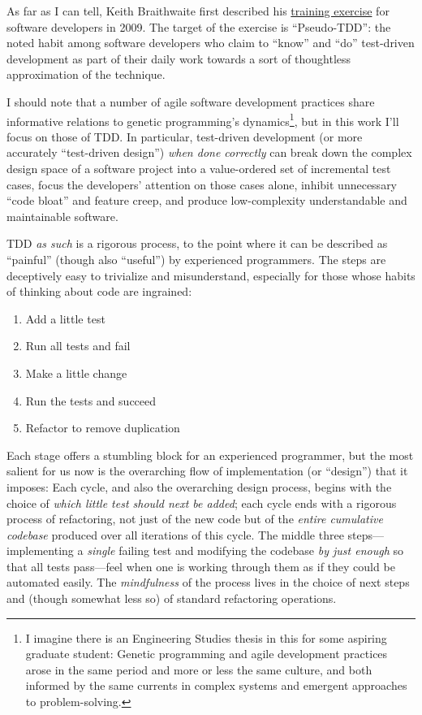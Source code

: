 As far as I can tell, Keith Braithwaite first described his \href{http://cumulative-hypotheses.org/2011/08/30/tdd-as-if-you-meant-it/}{training exercise} for software developers in 2009. The target of the exercise is ``Pseudo-TDD'': the noted habit among software developers who claim to ``know'' and ``do'' test-driven development as part of their daily work towards a sort of thoughtless approximation of the technique.

I should note that a number of agile software development practices share informative relations to genetic programming's dynamics\footnote{I imagine there is an Engineering Studies thesis in this for some aspiring graduate student: Genetic programming and agile development practices arose in the same period and more or less the same culture, and both informed by the same currents in complex systems and emergent approaches to problem-solving.}, but in this work I'll focus on those of TDD. In particular, test-driven development (or more accurately ``test-driven design'') \emph{when done correctly} can break down the complex design space of a software project into a value-ordered set of incremental test cases, focus the developers' attention on those cases alone, inhibit unnecessary ``code bloat'' and feature creep, and produce low-complexity understandable and maintainable software.

TDD \emph{as such} is a rigorous process, to the point where it can be described as ``painful'' (though also ``useful'') by experienced programmers. The steps are deceptively easy to trivialize and misunderstand, especially for those whose habits of thinking about code are ingrained:

\begin{enumerate}
\item Add a little test
\item Run all tests and fail
\item Make a little change
\item Run the tests and succeed
\item Refactor to remove duplication
\end{enumerate}

Each stage offers a stumbling block for an experienced programmer, but the most salient for us now is the overarching flow of implementation (or ``design'') that it imposes: Each cycle, and also the overarching design process, begins with the choice of \emph{which little test should next be added}; each cycle ends with a rigorous process of refactoring, not just of the new code but of the \emph{entire cumulative codebase} produced over all iterations of this cycle. The middle three steps---implementing a \emph{single} failing test and modifying the codebase \emph{by just enough} so that all tests pass---feel when one is working through them as if they could be automated easily. The \emph{mindfulness} of the process lives in the choice of next steps and (though somewhat less so) of standard refactoring operations.


